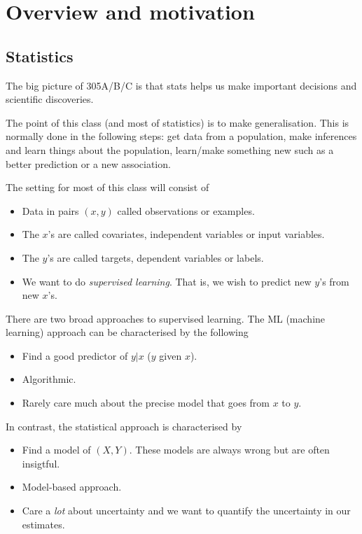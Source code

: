 \section{Overview and motivation}

\subsection{Statistics}
The big picture of 305A/B/C is that stats helps us make important decisions and scientific discoveries.

The point of this class (and most of statistics) is to make generalisation. This is normally done in the following steps: get data from a population, make inferences and learn things about the population, learn/make something new such as a better prediction or a new association.

The setting for most of this class will consist of
\begin{itemize}
    \item Data in pairs $(x,y)$ called observations or examples.
    \item The $x$'s are called covariates, independent variables or input variables.
    \item The $y$'s are called targets, dependent variables  or labels.
    \item We want to do \emph{supervised learning}. That is, we wish to predict new $y$'s from new $x$'s.
\end{itemize}
There are two broad approaches to supervised learning. The ML (machine learning) approach can be characterised by the following
\begin{itemize}
    \item Find a good predictor of $y| x$ ($y$ given $x$).
    \item Algorithmic.
    \item Rarely care much about the precise model that goes from $x$ to $y$.
\end{itemize}
In contrast, the statistical approach is characterised by
\begin{itemize}
    \item Find a model of $(X,Y)$. These models are always wrong but are often insigtful.
    \item Model-based approach.
    \item Care a \emph{lot} about uncertainty and we want to quantify the uncertainty in our estimates.
\end{itemize}



